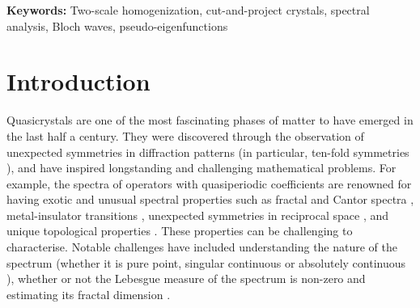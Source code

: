 \documentclass[a4paper,reqno]{amsart}
\numberwithin{equation}{section}
\numberwithin{equation}{section}		%
\numberwithin{figure}{section}			%
\numberwithin{table}{section}				%
\theoremstyle{definition}
\newcommand{\<}{\ensuremath \leq}
\renewcommand{\>}{\ensuremath \geq}
\begin{document}
\begin{abstract}
We study the spectral asymptotics of elliptic operators with quasiperiodic coefficients by exploiting projections from higher-dimensional periodic functions. Using the framework of two-scale convergence adapted to cut-and-project quasiperiodic structures we establish that, in the low-frequency (homogenization) regime, the spectrum converges to that of a homogenized operator with effective coefficients determined by a cell problem on the higher-dimensional torus. In the high-frequency regime, we introduce a rescaling approach that transforms the problem to an expanding domain with asymptotically frozen coefficients. In the critical scaling, the rescaled spectrum converges to the union of the Bloch spectra arising from the quasiperiodic bulk and a boundary layer spectrum consisting of eigenfunctions concentrated near the boundary of the macroscopic domain. This boundary spectrum can be characterised as a subset of the spectrum of a family of half-space operators with frozen macroscopic coefficients. For any non-critical scaling, the rescaled spectrum fills the positive real line.
\end{abstract}
\maketitle

\noindent\textbf{Keywords:} Two-scale homogenization, cut-and-project crystals, spectral analysis, Bloch waves, pseudo-eigenfunctions


\section{Introduction}

Quasicrystals are one of the most fascinating phases of matter to have emerged in the last half a century. They were discovered through the observation of unexpected symmetries in diffraction patterns (in particular, ten-fold symmetries \cite{shechtman1984metallic}), and have inspired longstanding and challenging mathematical problems. For example, the spectra of operators with quasiperiodic coefficients are renowned for having exotic and unusual spectral properties such as fractal and Cantor spectra \cite{Simon1982, avila2009ten, nonnenmacher2005fractal}, metal-insulator transitions \cite{jitomirskaya1999metal, morison2022order}, unexpected symmetries in reciprocal space \cite{shechtman1984metallic}, and unique topological properties \cite{liu2022topological, putley2024mixing, agazzi2014colored}. These properties can be challenging to characterise. Notable challenges have included understanding the nature of the spectrum (whether it is pure point, singular continuous or absolutely continuous \cite{avila2009ten}), whether or not the Lebesgue measure of the spectrum is non-zero \cite{sutHo1989singular} and estimating its fractal dimension \cite{damanik2008hyperbolicity}.
\end{document}
